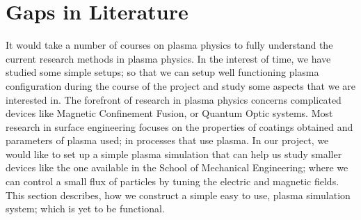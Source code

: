 \documentclass[12pt]{article}
\begin{document}
	\section{Gaps in Literature}
	It would take a number of courses on plasma physics to fully understand the current research methods in plasma physics. In the interest of time, we have studied some simple setups; so that we can setup well functioning plasma configuration during the course of the project and study some aspects that we are interested in. The forefront of research in plasma physics concerns complicated devices like Magnetic Confinement Fusion, or Quantum Optic systems. Most research in surface engineering focuses on the properties of coatings obtained and parameters of plasma used; in processes that use plasma. In our project, we would like to set up a simple plasma simulation that can help us study smaller devices like the one available in the School of Mechanical Engineering; where we can control a small flux of particles by tuning the electric and magnetic fields. This section describes, how we construct a simple easy to use, plasma simulation system; which is yet to be functional.
	
\end{document}

